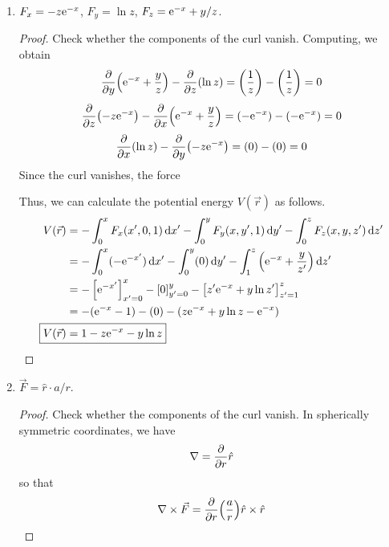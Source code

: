 \documentclass[../psets.tex]{subfiles}
\begin{document}
\begin{enumerate}
\begin{enumerate}
\begin{proof}
        \end{proof}
        \item $F_x=-z\e[-x]$, $F_y=\ln z$, $F_z=\e[-x]+y/z$.
        \begin{proof}
            Check whether the components of the curl vanish. Computing, we obtain
            \begin{equation*}
                \pdv{y}(\e[-x]+\frac{y}{z})-\pdv{z}(\ln z) = \left( \frac{1}{z} \right)-\left( \frac{1}{z} \right)
                = 0
            \end{equation*}
            \begin{equation*}
                \pdv{z}(-z\e[-x])-\pdv{x}(\e[-x]+\frac{y}{z}) = (-\e[-x])-(-\e[-x])
                = 0
            \end{equation*}
            \begin{equation*}
                \pdv{x}(\ln z)-\pdv{y}(-z\e[-x]) = (0)-(0)
                = 0
            \end{equation*}
            Since the curl vanishes, the force \par
            Thus, we can calculate the potential energy $V(\vec{r})$ as follows.
            \begin{align*}
                V(\vec{r}) &= -\int_0^xF_x(x',0,1)\dd{x'}-\int_0^yF_y(x,y',1)\dd{y'}-\int_0^zF_z(x,y,z')\dd{z'}\\
                &= -\int_0^x(-\e[-x'])\dd{x'}-\int_0^y(0)\dd{y'}-\int_1^z\left( \e[-x]+\frac{y}{z'} \right)\dd{z'}\\
                &= -\left[ \e[-x'] \right]_{x'=0}^x-\left[ 0 \right]_{y'=0}^y-\left[ z'\e[-x]+y\ln z' \right]_{z'=1}^z\\
                &= -(\e[-x]-1)-(0)-(z\e[-x]+y\ln z-\e[-x])\\
                \Aboxed{V(\vec{r}) &= 1-z\e[-x]-y\ln z}
            \end{align*}
        \end{proof}
        \item $\vec{F}=\hat{r}\cdot a/r$.
        \begin{proof}
            Check whether the components of the curl vanish. In spherically symmetric coordinates, we have
            \begin{equation*}
                \nabla = \pdv{r}\hat{r}
            \end{equation*}
            so that
            \begin{equation*}
                \nabla\times\vec{F} = \pdv{r}(\frac{a}{r})\hat{r}\times\hat{r}

\end{equation*}
\end{proof}
\end{enumerate}
\end{enumerate}
\end{document}

